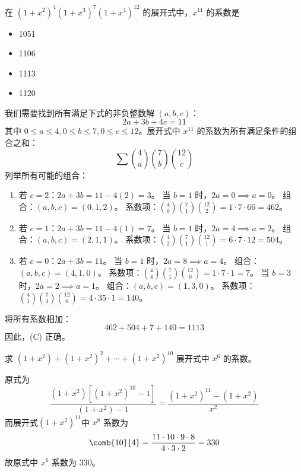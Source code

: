 \begin{questions}
\question 在 $(1 + x^2)^4 (1 + x^3)^7 (1 + x^4)^{12}$ 的展开式中，$x^{11}$ 的系数是

\begin{itemize}
    \item[(A)] 1051
    \item[(B)] 1106
    \item[(C)] 1113
    \item[(D)] 1120
\end{itemize}

\begin{solution}
我们需要找到所有满足下式的非负整数解 $(a, b, c)$：
\[
2a + 3b + 4c = 11
\]
其中 $0 \le a \le 4, 0 \le b \le 7, 0 \le c \le 12$。展开式中 $x^{11}$ 的系数为所有满足条件的组合之和：
\[
\sum \binom{4}{a} \binom{7}{b} \binom{12}{c}
\]
列举所有可能的组合：
\begin{enumerate}
    \item 若 $c = 2$：$2a + 3b = 11 - 4(2) = 3$。
    当 $b = 1$ 时，$2a = 0 \implies a = 0$。
    组合：$(a, b, c) = (0, 1, 2)$。
    系数项：$\binom{4}{0} \binom{7}{1} \binom{12}{2} = 1 \cdot 7 \cdot 66 = 462$。

    \item 若 $c = 1$：$2a + 3b = 11 - 4(1) = 7$。
    当 $b = 1$ 时，$2a = 4 \implies a = 2$。
    组合：$(a, b, c) = (2, 1, 1)$。
    系数项：$\binom{4}{2} \binom{7}{1} \binom{12}{1} = 6 \cdot 7 \cdot 12 = 504$。

    \item 若 $c = 0$：$2a + 3b = 11$。
    当 $b = 1$ 时，$2a = 8 \implies a = 4$。
    组合：$(a, b, c) = (4, 1, 0)$。
    系数项：$\binom{4}{4} \binom{7}{1} \binom{12}{0} = 1 \cdot 7 \cdot 1 = 7$。
    当 $b = 3$ 时，$2a = 2 \implies a = 1$。
    组合：$(a, b, c) = (1, 3, 0)$。
    系数项：$\binom{4}{1} \binom{7}{3} \binom{12}{0} = 4 \cdot 35 \cdot 1 = 140$。
\end{enumerate}

将所有系数相加：
\[
462 + 504 + 7 + 140 = 1113
\]
因此，(C) 正确。
\end{solution}

    \question 求 \( (1 + x^2) + (1 + x^2)^2 + \cdots + (1 + x^2)^{10} \) 展开式中 \( x^6 \) 的系数。  
    \begin{solution}
        原式为
        \[
        \frac{(1+x^2) \left[ (1+x^2)^{10}-1 \right]}{(1+x^2)-1} = \frac{(1+x^2)^{11}-(1+x^2)}{x^2}
        \]
        而展开式$(1+x^2)^{11}$中 $x^8$ 系数为 
        \[
        \comb{10}{4} = \dfrac{11 \cdot 10 \cdot 9 \cdot 8}{4 \cdot 3 \cdot 2} = 330
        \]
        故原式中 $x^6$ 系数为 $330$。
    \end{solution}


\end{questions}
